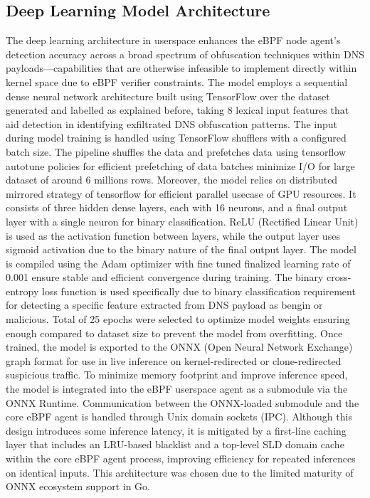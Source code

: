 \documentclass [11pt, proquest] {uwthesis}[2020/02/24]
\begin{document}
\subsection{Deep Learning Model Architecture}
\label{sec:ml}
The deep learning architecture in userspace enhances the eBPF node agent’s detection accuracy across a broad spectrum of obfuscation techniques within DNS payloads—capabilities that are otherwise infeasible to implement directly within kernel space due to eBPF verifier constraints. The model employs a sequential dense neural network architecture  built using TensorFlow over the dataset generated and labelled as explained before, taking 8 lexical input features that aid detection in identifying exfiltrated DNS obfuscation patterns. The input during model training is handled using TensorFlow shufflers with a configured batch size. The pipeline shuffles the data and prefetches data using tensorflow autotune policies for efficient prefetching of data batches minimize I/O for large dataset of around 6 millions rows. Moreover, the model relies on distributed mirrored strategy of tensorflow for efficient parallel usecase of GPU resources.
It consists of three hidden dense layers, each with 16 neurons, and a final output layer with a single neuron for binary classification. ReLU (Rectified Linear Unit) is used as the activation function between layers, while the output layer uses sigmoid activation due to the binary nature of the final output layer. The model is compiled using the Adam optimizer with fine tuned finalized learning rate of 0.001 ensure stable and efficient convergence during training. The binary cross-entropy loss function is used specifically due to binary classification requirement for detecting a specific feature extracted from DNS payload as bengin or malicious. Total of 25 epochs were selected to optimize model weights ensuring enough compared to dataset size to prevent the model from overfitting. 
Once trained, the model is exported to the ONNX (Open Neural Network Exchange) graph format for use in live inference on kernel-redirected or clone-redirected suspicious traffic. To minimize memory footprint and improve inference speed, the model is integrated into the eBPF userspace agent as a submodule via the ONNX Runtime. Communication between the ONNX-loaded submodule and the core eBPF agent is handled through Unix domain sockets (IPC). Although this design introduces some inference latency, it is mitigated by a first-line caching layer that includes an LRU-based blacklist and a top-level SLD domain cache within the core eBPF agent process, improving efficiency for repeated inferences on identical inputs. This architecture was chosen due to the limited maturity of ONNX ecosystem support in Go.
\end{document}
